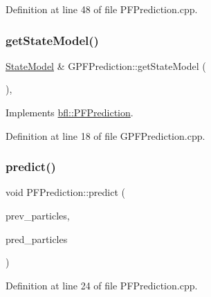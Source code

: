 Definition at line 48 of file P\+F\+Prediction.\+cpp.

\mbox{\label{classbfl_1_1GPFPrediction_a3b8c347633b8db630af4945548980794}} 
\subsubsection{\texorpdfstring{get\+State\+Model()}{getStateModel()}}
{\footnotesize\ttfamily \mbox{\hyperlink{classbfl_1_1StateModel}{State\+Model}} \& G\+P\+F\+Prediction\+::get\+State\+Model (\begin{DoxyParamCaption}{ }\end{DoxyParamCaption})\hspace{0.3cm}{\ttfamily [override]}, {\ttfamily [virtual]}}



Implements \mbox{\hyperlink{classbfl_1_1PFPrediction_a1a0f7a1d66a6849c2de10459c6b8f8ac}{bfl\+::\+P\+F\+Prediction}}.



Definition at line 18 of file G\+P\+F\+Prediction.\+cpp.

\mbox{\label{classbfl_1_1PFPrediction_a129dcd1cccd2da9827ef0c49c90b9345}} 
\subsubsection{\texorpdfstring{predict()}{predict()}}
{\footnotesize\ttfamily void P\+F\+Prediction\+::predict (\begin{DoxyParamCaption}\item[{const \mbox{\hyperlink{classbfl_1_1ParticleSet}{bfl\+::\+Particle\+Set}} \&}]{prev\+\_\+particles,  }\item[{\mbox{\hyperlink{classbfl_1_1ParticleSet}{bfl\+::\+Particle\+Set}} \&}]{pred\+\_\+particles }\end{DoxyParamCaption})\hspace{0.3cm}{\ttfamily [inherited]}}



Definition at line 24 of file P\+F\+Prediction.\+cpp.

